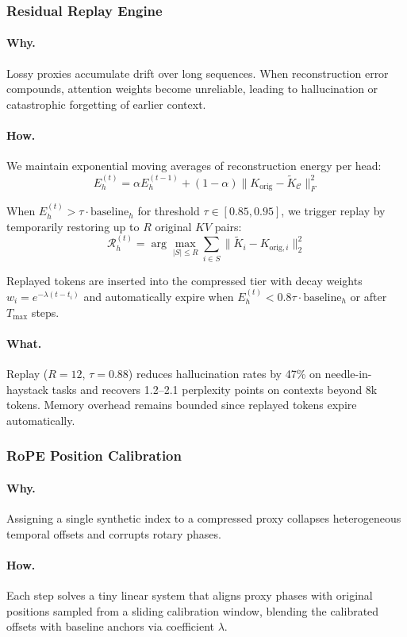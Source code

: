 \documentclass[11pt]{article}
\newcommand{\kv}{KV}
\newcommand{\compressed}{\mathcal{C}}
\begin{document}
\subsubsection{Residual Replay Engine}
\paragraph{Why.}
Lossy proxies accumulate drift over long sequences. When reconstruction error compounds, attention weights become unreliable, leading to hallucination or catastrophic forgetting of earlier context.

\paragraph{How.}
We maintain exponential moving averages of reconstruction energy per head:
\[
  E_h^{(t)} = \alpha E_h^{(t-1)} + (1-\alpha) \|K_{\text{orig}} - \tilde K_{\compressed}\|_F^2
\]

When $E_h^{(t)} > \tau \cdot \text{baseline}_h$ for threshold $\tau \in [0.85, 0.95]$, we trigger replay by temporarily restoring up to $R$ original $\kv$ pairs:
\[
  \mathcal{R}_h^{(t)} = \arg\max_{|S| \leq R} \sum_{i \in S} \|\tilde K_i - K_{\text{orig},i}\|_2^2
\]

Replayed tokens are inserted into the compressed tier with decay weights $w_i = e^{-\lambda (t - t_i)}$ and automatically expire when $E_h^{(t)} < 0.8 \tau \cdot \text{baseline}_h$ or after $T_{\max}$ steps.

\paragraph{What.}
Replay ($R = 12$, $\tau = 0.88$) reduces hallucination rates by 47\% on needle-in-haystack tasks and recovers 1.2--2.1 perplexity points on contexts beyond 8k tokens. Memory overhead remains bounded since replayed tokens expire automatically.

\subsubsection{RoPE Position Calibration}
\paragraph{Why.}
Assigning a single synthetic index to a compressed proxy collapses heterogeneous temporal offsets and corrupts rotary phases.
\paragraph{How.}
Each step solves a tiny linear system that aligns proxy phases with original positions sampled from a sliding calibration window, blending the calibrated offsets with baseline anchors via coefficient $\lambda$.
\end{document}
